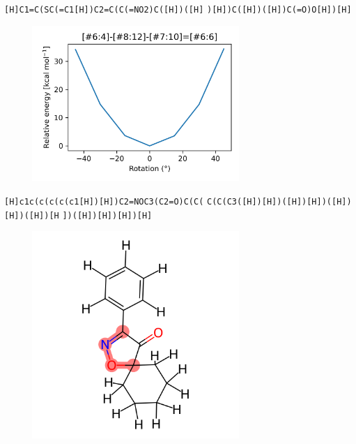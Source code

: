 \documentclass{beamer}
\begin{document}
\begin{frame}[fragile]
\verb|[H]C1=C(SC(=C1[H])C2=C(C(=NO2)C([H])([H]|
\verb|)[H])C([H])([H])C(=O)O[H])[H]|

\begin{figure}
    \includegraphics[width=0.7\textwidth,height=0.7\textheight,keepaspectratio]{plot07.png}
\end{figure}
\end{frame}
\begin{frame}[fragile]
\verb|[H]c1c(c(c(c(c1[H])[H])C2=NOC3(C2=O)C(C(|
\verb|C(C(C3([H])[H])([H])[H])([H])[H])([H])[H|
\verb|])([H])[H])[H])[H]|

\begin{figure}
    \includegraphics[width=0.7\textwidth,height=0.7\textheight,keepaspectratio]{mol08.png}
\end{figure}
\end{frame}
\end{document}
